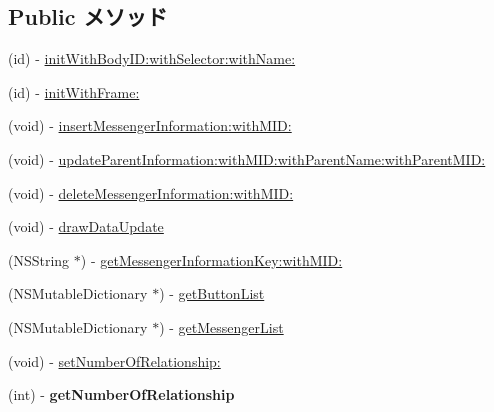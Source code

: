 \subsection*{Public メソッド}
\begin{DoxyCompactItemize}
\item 
(id) -\/ \hyperlink{interface_messenger_view_controller_a44c0a2552e50d6223a8230447be3e83a}{initWithBodyID:withSelector:withName:}
\item 
(id) -\/ \hyperlink{interface_messenger_view_controller_a1ac23270dbc04a95b72dd16b2c201c5a}{initWithFrame:}
\item 
(void) -\/ \hyperlink{interface_messenger_view_controller_aa30151ef1d95034a10fa31e9c8a7da22}{insertMessengerInformation:withMID:}
\item 
(void) -\/ \hyperlink{interface_messenger_view_controller_a3eb404c4ef5fc51caae10e71136f35ff}{updateParentInformation:withMID:withParentName:withParentMID:}
\item 
(void) -\/ \hyperlink{interface_messenger_view_controller_ab9c9343a0f520cdc1aa91b3985b31f7a}{deleteMessengerInformation:withMID:}
\item 
(void) -\/ \hyperlink{interface_messenger_view_controller_aba89f37600bb5cc7258a034614257dc6}{drawDataUpdate}
\item 
(NSString $\ast$) -\/ \hyperlink{interface_messenger_view_controller_a9c958b9ee93a81551b3aa4209eaa3c71}{getMessengerInformationKey:withMID:}
\item 
(NSMutableDictionary $\ast$) -\/ \hyperlink{interface_messenger_view_controller_afa883d1d29e91d003087a0f4b839daf3}{getButtonList}
\item 
(NSMutableDictionary $\ast$) -\/ \hyperlink{interface_messenger_view_controller_a2e4617fc57087279158f9df78fab0a87}{getMessengerList}
\item 
(void) -\/ \hyperlink{interface_messenger_view_controller_aa75f66a06d37f03a7d2b51e9c7149051}{setNumberOfRelationship:}
\item 
\hypertarget{interface_messenger_view_controller_aa06b18307f500c793a8493da0969b57b}{
(int) -\/ {\bfseries getNumberOfRelationship}}
\label{d7/d34/interface_messenger_view_controller_aa06b18307f500c793a8493da0969b57b}


\end{DoxyCompactItemize}
